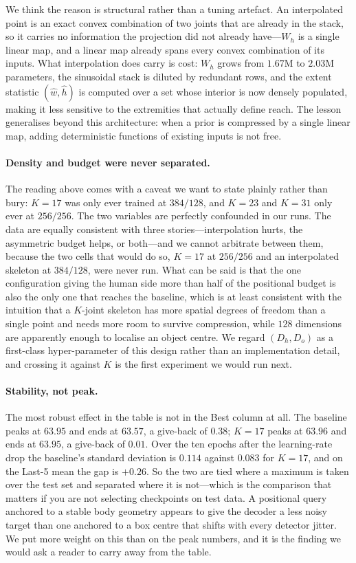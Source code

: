 \documentclass[12pt,a4paper]{article}
\begin{document}
We think the reason is structural rather than a tuning artefact. An interpolated
point is an exact convex combination of two joints that are already in the
stack, so it carries no information the projection did not already have---$W_h$
is a single linear map, and a linear map already spans every convex combination
of its inputs. What interpolation does carry is cost: $W_h$ grows from $1.67$M
to $2.03$M parameters, the sinusoidal stack is diluted by redundant rows, and
the extent statistic $(\hat{w}, \hat{h})$ is computed over a set whose interior
is now densely populated, making it less sensitive to the extremities that
actually define reach. The lesson generalises beyond this architecture: when a
prior is compressed by a single linear map, adding deterministic functions of
existing inputs is not free.

\paragraph{Density and budget were never separated.} The reading above comes
with a caveat we want to state plainly rather than bury: $K{=}17$ was only ever
trained at $384/128$, and $K{=}23$ and $K{=}31$ only ever at $256/256$. The two
variables are perfectly confounded in our runs. The data are equally consistent
with three stories---interpolation hurts, the asymmetric budget helps, or
both---and we cannot arbitrate between them, because the two cells that would
do so, $K{=}17$ at $256/256$ and an interpolated skeleton at $384/128$, were
never run. What can be said is that the one configuration giving the human side
more than half of the positional budget is also the only one that reaches the
baseline, which is at least consistent with the intuition that a $K$-joint
skeleton has more spatial degrees of freedom than a single point and needs more
room to survive compression, while $128$ dimensions are apparently enough to
localise an object centre. We regard $(D_h, D_o)$ as a first-class
hyper-parameter of this design rather than an implementation detail, and
crossing it against $K$ is the first experiment we would run next.

\paragraph{Stability, not peak.} The most robust effect in the table is not in
the Best column at all. The baseline peaks at $63.95$ and ends at $63.57$, a
give-back of $0.38$; $K{=}17$ peaks at $63.96$ and ends at $63.95$, a give-back
of $0.01$. Over the ten epochs after the learning-rate drop the baseline's
standard deviation is $0.114$ against $0.083$ for $K{=}17$, and on the Last-5
mean the gap is $+0.26$. So the two are tied where a maximum is taken over the
test set and separated where it is not---which is the comparison that matters
if you are not selecting checkpoints on test data. A positional query anchored
to a stable body geometry appears to give the decoder a less noisy target than
one anchored to a box centre that shifts with every detector jitter. We put
more weight on this than on the peak numbers, and it is the finding we would
ask a reader to carry away from the table.
\end{document}
